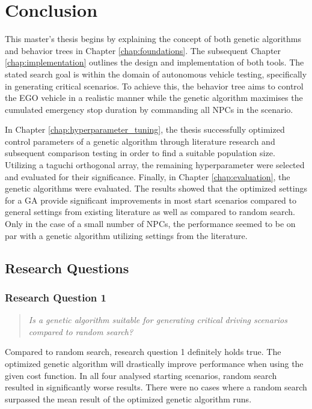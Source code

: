 \chapter{Conclusion}
This master's thesis begins by explaining the concept of both genetic algorithms and behavior trees in Chapter \ref{chap:foundations}. The subsequent Chapter \ref{chap:implementation} outlines the design and implementation of both tools. The stated search goal is within the domain of autonomous vehicle testing, specifically in generating critical scenarios. To achieve this, the behavior tree aims to control the EGO vehicle in a realistic manner while the genetic algorithm maximises the cumulated emergency stop duration by commanding all NPCs in the scenario. 

In Chapter \ref{chap:hyperparameter_tuning}, the thesis successfully optimized control parameters of a genetic algorithm through literature research and subsequent comparison testing in order to find a suitable population size. Utilizing a taguchi orthogonal array, the remaining hyperparameter were selected and evaluated for their significance. Finally, in Chapter \ref{chap:evaluation}, the genetic algorithms were evaluated. The results showed that the optimized settings for a GA provide significant improvements in most start scenarios compared to general settings from existing literature as well as compared to random search. Only in the case of a small number of NPCs, the performance seemed to be on par with a genetic algorithm utilizing settings from the literature.

\section{Research Questions}
\subsection{Research Question 1}
\begin{quote}
	\begin{em}
		\textit{Is a genetic algorithm suitable for generating critical driving scenarios compared to random search?}
	\end{em}
\end{quote}

Compared to random search, research question 1 definitely holds true. The optimized genetic algorithm will drastically improve performance when using the given cost function. In all four analysed starting scenarios, random search resulted in significantly worse results. There were no cases where a random search surpassed the mean result of the optimized genetic algorithm runs.

